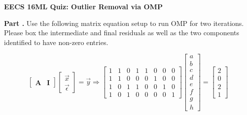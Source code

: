 \documentclass[11pt,letterpaper]{article}
\newcounter{problem}
\newcommand{\problem}{
	\stepcounter{problem}%
	\noindent \textbf{Part \theproblem. }%
}
\newcommand{\pspace}{\par\vspace{\baselineskip}}
\begin{document}
\textbf{EECS 16ML Quiz: Outlier Removal via OMP} \pspace


\problem Use the following matrix equation setup to run OMP for two iterations. Please box the intermediate and final residuals as well as the two components identified to have non-zero entries.

\begin{equation*}
    \begin{bmatrix}
        \boldsymbol{A} & \boldsymbol{I}
    \end{bmatrix}\begin{bmatrix}
        \vec{x} \\
        \vec{\epsilon}
    \end{bmatrix}
     = \vec{y} \Rightarrow
    \begin{bmatrix}
         1 & 1 & 0 & 1 & 1 & 0 & 0 & 0 \\
         1 & 1 & 0 & 0 & 0 & 1 & 0 & 0 \\
         1 & 0 & 1 & 1 & 0 & 0 & 1 & 0 \\
         1 & 0 & 1 & 0 & 0 & 0 & 0 & 1
    \end{bmatrix}
    \begin{bmatrix}
         a \\ b \\ c \\ d \\ e \\ f \\ g \\ h
    \end{bmatrix}
    =\begin{bmatrix}
         2 \\ 0 \\ 2 \\ 1
    \end{bmatrix}
\end{equation*}
\end{document}
